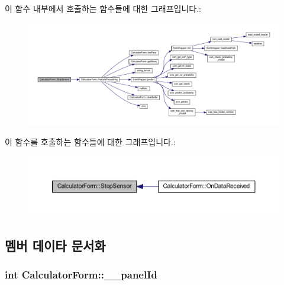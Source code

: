 이 함수 내부에서 호출하는 함수들에 대한 그래프입니다.\+:
\nopagebreak
\begin{figure}[H]
\begin{center}
\leavevmode
\includegraphics[width=350pt]{class_calculator_form_a2ea52e1ac047a01188384b416d41c461_cgraph}
\end{center}
\end{figure}




이 함수를 호출하는 함수들에 대한 그래프입니다.\+:
\nopagebreak
\begin{figure}[H]
\begin{center}
\leavevmode
\includegraphics[width=350pt]{class_calculator_form_a2ea52e1ac047a01188384b416d41c461_icgraph}
\end{center}
\end{figure}




\subsection{멤버 데이타 문서화}
\hypertarget{class_calculator_form_a4b8ee8d07acfddbe9140a17a37b23109}{
\subsubsection[{\+\_\+\+\_\+panel\+Id}]{\setlength{\rightskip}{0pt plus 5cm}int Calculator\+Form\+::\+\_\+\+\_\+panel\+Id\hspace{0.3cm}{\ttfamily [protected]}}}\label{class_calculator_form_a4b8ee8d07acfddbe9140a17a37b23109}


